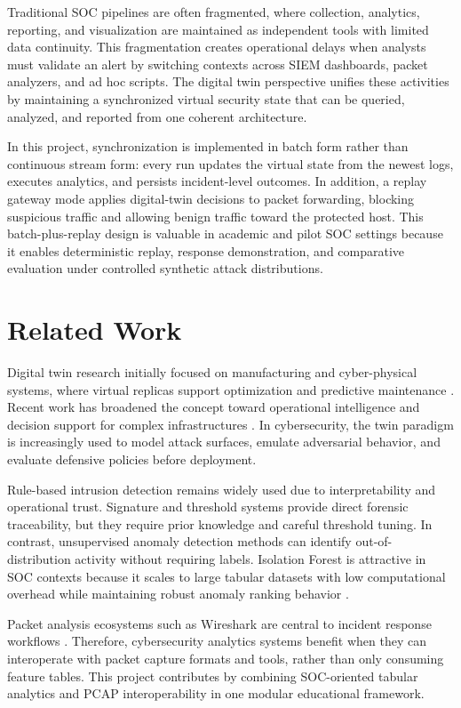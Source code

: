 \documentclass[conference]{IEEEtran}
\begin{document}
Traditional SOC pipelines are often fragmented, where collection, analytics, reporting, and visualization are maintained as independent tools with limited data continuity. This fragmentation creates operational delays when analysts must validate an alert by switching contexts across SIEM dashboards, packet analyzers, and ad hoc scripts. The digital twin perspective unifies these activities by maintaining a synchronized virtual security state that can be queried, analyzed, and reported from one coherent architecture.

In this project, synchronization is implemented in batch form rather than continuous stream form: every run updates the virtual state from the newest logs, executes analytics, and persists incident-level outcomes. In addition, a replay gateway mode applies digital-twin decisions to packet forwarding, blocking suspicious traffic and allowing benign traffic toward the protected host. This batch-plus-replay design is valuable in academic and pilot SOC settings because it enables deterministic replay, response demonstration, and comparative evaluation under controlled synthetic attack distributions.

\section{Related Work}
Digital twin research initially focused on manufacturing and cyber-physical systems, where virtual replicas support optimization and predictive maintenance \cite{tao2018digitaltwin}. Recent work has broadened the concept toward operational intelligence and decision support for complex infrastructures \cite{fuller2020digitaltwin}. In cybersecurity, the twin paradigm is increasingly used to model attack surfaces, emulate adversarial behavior, and evaluate defensive policies before deployment.

Rule-based intrusion detection remains widely used due to interpretability and operational trust. Signature and threshold systems provide direct forensic traceability, but they require prior knowledge and careful threshold tuning. In contrast, unsupervised anomaly detection methods can identify out-of-distribution activity without requiring labels. Isolation Forest is attractive in SOC contexts because it scales to large tabular datasets with low computational overhead while maintaining robust anomaly ranking behavior \cite{liu2008iforest}.

Packet analysis ecosystems such as Wireshark are central to incident response workflows \cite{wireshark}. Therefore, cybersecurity analytics systems benefit when they can interoperate with packet capture formats and tools, rather than only consuming feature tables. This project contributes by combining SOC-oriented tabular analytics and PCAP interoperability in one modular educational framework.
\end{document}
